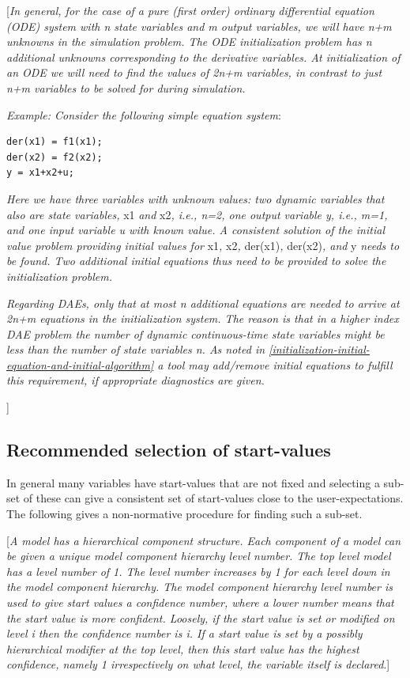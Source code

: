 \documentclass[10pt,a4paper]{report}
\def\doublelabel#1{\label{#1}}
\begin{document}
{[}\emph{In general, for the case of a pure (first order) ordinary
differential equation (ODE) system with n state variables and m output
variables, we will have n+m unknowns in the simulation problem. The ODE
initialization problem has n additional unknowns corresponding to the
derivative variables. At initialization of an ODE we will need to find
the values of 2n+m variables, in contrast to just n+m variables to be
solved for during simulation.}

\emph{Example: Consider the following simple equation system}:
\begin{lstlisting}[language=modelica]
der(x1) = f1(x1);
der(x2) = f2(x2);
y = x1+x2+u;
\end{lstlisting}

\emph{Here we have three variables with unknown values: two dynamic
variables that also are state variables,} x1 \emph{and} x2\emph{, i.e.,
n=2, one output variable y, i.e., m=1, and one input variable u with
known value. A consistent solution of the initial value problem
providing initial values for} x1\emph{,} x2\emph{,} der(x1)\emph{,}
der(x2)\emph{, and} y \emph{needs to be found. Two additional initial
equations thus need to be provided to solve the initialization problem.}

\emph{Regarding DAEs, only that at most n additional equations are
needed to arrive at 2n+m equations in the initialization system. The
reason is that in a higher index DAE problem the number of dynamic
continuous-time state variables might be less than the number of state
variables n. As noted in \ref{initialization-initial-equation-and-initial-algorithm} a tool may add/remove
initial equations to fulfill this requirement, if appropriate
diagnostics are given. }

{]}

\subsection{Recommended selection of start-values}\doublelabel{recommended-selection-of-start-values}

In general many variables have start-values that are not fixed and
selecting a sub-set of these can give a consistent set of start-values
close to the user-expectations. The following gives a non-normative
procedure for finding such a sub-set.

{[}\emph{A model has a hierarchical component structure. Each component
of a model can be given a unique model component hierarchy level number.
The top level model has a level number of 1. The level number increases
by 1 for each level down in the model component hierarchy. The model
component hierarchy level number is used to give start values a
confidence number, where a lower number means that the start value is
more confident. Loosely, if the start value is set or modified on level
i then the confidence number is i. If a start value is set by a possibly
hierarchical modifier at the top level, then this start value has the
highest confidence, namely 1 irrespectively on what level, the variable
itself is declared}.{]}
\end{document}
